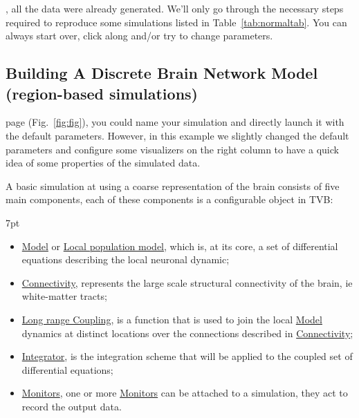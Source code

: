 \documentclass{tufte-handout}
\newenvironment{blah}{%
  \def\FrameCommand{%
    \hspace{1pt}%
    {\color{DarkOrange}\vrule width 2pt}%
    {\color{PeachPuff}\vrule width 4pt}%
    \colorbox{PeachPuff}%
  }%
  \MakeFramed{\advance\hsize-\width\FrameRestore}%
  \noindent\hspace{-4.55pt}%
  \begin{adjustwidth}{}{7pt}%
  \vspace{2pt}\vspace{2pt}%
}
{%
  \vspace{2pt}\end{adjustwidth}\endMakeFramed%
}
\begin{document}
, all the data were already generated. We'll only go through the necessary steps required to reproduce some simulations listed in Table~\ref{tab:normaltab}. You can always start over, click along and/or try to change parameters.


\subsection{Building A Discrete Brain Network Model (region-based simulations)}\label{sec:simulation}

 page (Fig.~\ref{fig:fig}), you could name your
simulation and directly launch it with the default parameters. However, in
this example we slightly changed the default parameters and configure some
visualizers on the right column to have a quick idea of some properties of the
simulated data.

A basic simulation at using a coarse representation of the brain consists of
five main components, each of these components is a configurable object in
TVB:

\begin{blah}
\begin{itemize}
\item \underline{Model} or \underline{Local population model}, which is, at its core, a set of differential equations describing the local neuronal dynamic;
\item \underline{Connectivity}, represents the large scale structural connectivity of the brain, ie white-matter tracts;
\item \underline{Long range Coupling}, is a function that is used to join the local \underline{Model} dynamics at distinct locations over the connections described in \underline{Connectivity};
\item \underline{Integrator}, is the integration scheme that will be applied to the coupled set of differential equations;
\item \underline{Monitors}, one or more \underline{Monitors} can be attached to a simulation, they act to record the output data.
\end{itemize}
\end{blah}
\end{document}
